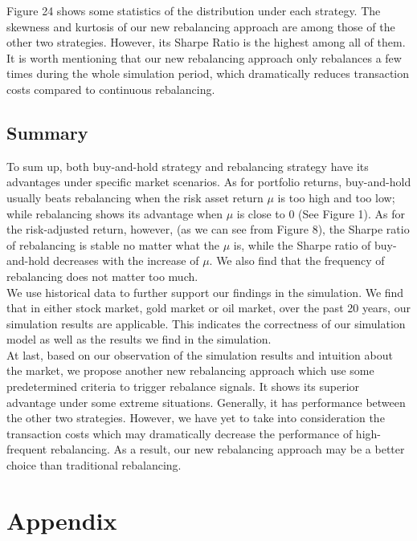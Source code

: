 \documentclass[
10pt, %
a4paper, %
oneside, %
headinclude,footinclude, %
BCOR5mm, %
]{scrartcl}
\begin{document}
Figure 24 shows some statistics of the distribution under each strategy. The skewness and kurtosis of our new rebalancing approach are among those of the other two strategies. However, its Sharpe Ratio is the highest among all of them.\\

It is worth mentioning that our new rebalancing approach only rebalances a few times during the whole simulation period, which dramatically reduces transaction costs compared to continuous rebalancing.\\

\subsection{Summary}

To sum up, both buy-and-hold strategy and rebalancing strategy have its advantages under specific market scenarios. As for portfolio returns, buy-and-hold usually beats rebalancing when the risk asset return $\mu$ is too high and too low; while rebalancing shows its advantage when $\mu$ is close to 0 (See Figure 1). As for the risk-adjusted return, however, (as we can see from Figure 8), the Sharpe ratio of rebalancing is stable no matter what the $\mu$ is, while the Sharpe ratio of buy-and-hold decreases with the increase of $\mu$. We also find that the frequency of rebalancing does not matter too much.\\

We use historical data to further support our findings in the simulation. We find that in either stock market, gold market or oil market, over the past 20 years, our simulation results are applicable. This indicates the correctness of our simulation model as well as the results we find in the simulation.\\

At last, based on our observation of the simulation results and intuition about the market, we propose another new rebalancing approach which use some predetermined criteria to trigger rebalance signals. It shows its superior advantage under some extreme situations. Generally, it has performance between the other two strategies. However, we have yet to take into consideration the transaction costs which may dramatically decrease the performance of high-frequent rebalancing. As a result, our new rebalancing approach may be a better choice than traditional rebalancing. 

\section{Appendix}
\end{document}
